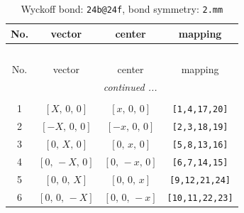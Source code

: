 \documentclass[fleqn,8pt]{jsarticle}
\begin{document}
\renewcommand{\arraystretch}{1.2}
\begin{longtable}{cccc}
\caption{Wyckoff bond: {\tt 24b@24f}, bond symmetry: {\tt 2.mm}}
 \\
 \hline \hline
No. & vector & center & mapping \\ \hline \endfirsthead

\multicolumn{3}{l}{\tablename\ \thetable{}} \\
 \hline \hline
No. & vector & center & mapping \\ \hline \endhead

 \hline \hline
\multicolumn{3}{r}{\footnotesize\it continued ...} \\ \endfoot

 \hline \hline
\multicolumn{3}{r}{} \\ \endlastfoot

1 & $\left[ X,\, 0,\, 0 \right]$ & $\left[ x,\, 0,\, 0 \right]$ & {\tt [1,4,17,20]} \\ \hline
2 & $\left[ - X,\, 0,\, 0 \right]$ & $\left[ - x,\, 0,\, 0 \right]$ & {\tt [2,3,18,19]} \\ \hline
3 & $\left[ 0,\, X,\, 0 \right]$ & $\left[ 0,\, x,\, 0 \right]$ & {\tt [5,8,13,16]} \\ \hline
4 & $\left[ 0,\, - X,\, 0 \right]$ & $\left[ 0,\, - x,\, 0 \right]$ & {\tt [6,7,14,15]} \\ \hline
5 & $\left[ 0,\, 0,\, X \right]$ & $\left[ 0,\, 0,\, x \right]$ & {\tt [9,12,21,24]} \\ \hline
6 & $\left[ 0,\, 0,\, - X \right]$ & $\left[ 0,\, 0,\, - x \right]$ & {\tt [10,11,22,23]} \\
\end{longtable}
\renewcommand{\arraystretch}{1.2}
\end{document}
